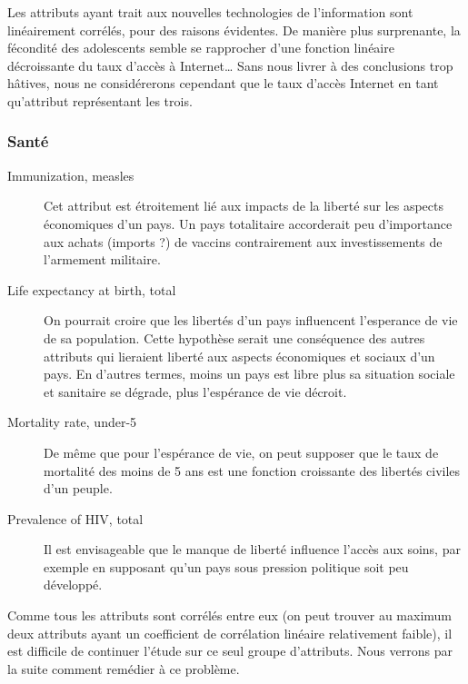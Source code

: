 Les attributs ayant trait aux nouvelles technologies de l'information sont linéairement corrélés, pour des raisons évidentes. De manière plus surprenante, la fécondité des adolescents semble se rapprocher d'une fonction linéaire décroissante du taux d'accès à Internet\ldots
Sans nous livrer à des conclusions trop hâtives, nous ne considérerons cependant que le taux d'accès Internet en tant qu'attribut représentant les trois.

\subsubsection{Santé}
\begin{description}
\item [Immunization, measles]
Cet attribut est étroitement lié aux impacts de la liberté sur les aspects économiques d'un pays. Un pays totalitaire
accorderait peu d'importance aux achats (imports ?) de vaccins contrairement aux investissements de l'armement militaire.
\item [Life expectancy at birth, total]
On pourrait croire que les libertés d'un pays influencent l'esperance de vie de sa population. Cette hypothèse serait une conséquence
des autres attributs qui lieraient liberté aux aspects économiques et sociaux d'un pays. En d'autres termes, moins un pays est libre plus sa situation sociale et sanitaire se dégrade, plus l'espérance de vie décroit.
\item [Mortality rate, under-5]
De même que pour l'espérance de vie, on peut supposer que le taux de mortalité des moins de 5 ans est une fonction croissante des libertés civiles d'un peuple.
\item [Prevalence of HIV, total]
Il est envisageable que le manque de liberté influence l'accès aux soins, par exemple en supposant qu'un pays sous pression politique soit peu développé.
\end{description}

Comme tous les attributs sont corrélés entre eux (on peut trouver au maximum deux attributs ayant un coefficient de corrélation linéaire relativement faible), il est difficile de continuer l'étude sur ce seul groupe d'attributs. Nous verrons par la suite comment remédier à ce problème.


